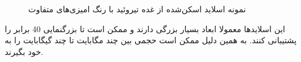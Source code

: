 \begin{figure}
\begin{center}
	\end{center}
	\caption{نمونه اسلاید اسکن‌شده از غده تیروئید با رنگ امیزی‌های متفاوت}
	\label{fig:samplecoloringfrompapsociety}
\end{figure}
این اسلاید‌ها معمولا ابعاد بسیار بزرگی دارند و ممکن است تا بزرگنمایی 40 برابر را پشتیبانی کنند.
به همین دلیل ممکن است حجمی بین چند مگابایت تا چند گیگابایت را به خود بگیرند.
